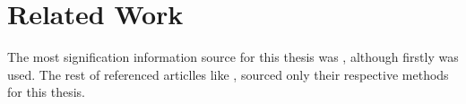 \chapter{Related Work}

The most signification information source for this thesis was \cite{remus2015}, although firstly \cite{remus2011} was used.
The rest of referenced articlles like \cite{kamal2013}, sourced only their respective methods for this thesis.